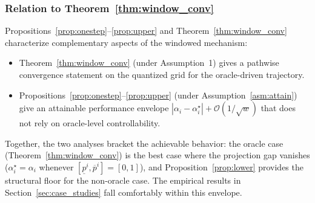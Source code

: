 \documentclass[a4paper,fleqn]{cas-dc}
\theoremstyle{plain}
\theoremstyle{remark}
\theoremstyle{plain}
\begin{document}
\subsubsection{Relation to Theorem~\ref{thm:window_conv}}
Propositions~\ref{prop:onestep}--\ref{prop:upper} and Theorem~\ref{thm:window_conv} characterize complementary aspects of the windowed mechanism:
\begin{itemize}
\item Theorem~\ref{thm:window_conv} (under Assumption~1) gives a pathwise convergence statement on the quantized grid for the oracle-driven trajectory.
\item Propositions~\ref{prop:onestep}--\ref{prop:upper} (under Assumption~\ref{asm:attain}) give an attainable performance envelope $|\alpha_i-\alpha_i^\star|+\mathcal{O}(1/\sqrt{w})$ that does not rely on oracle-level controllability.
\end{itemize}
Together, the two analyses bracket the achievable behavior: the oracle case (Theorem~\ref{thm:window_conv}) is the best case where the projection gap vanishes ($\alpha_i^\star=\alpha_i$ whenever $[\underline p^i,\overline p^i]=[0,1]$), and Proposition~\ref{prop:lower} provides the structural floor for the non-oracle case. The empirical results in Section~\ref{sec:case_studies} fall comfortably within this envelope.



\FloatBarrier


\end{document}
